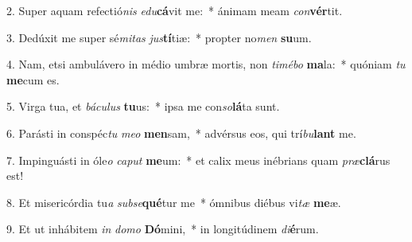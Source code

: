 2. Super aquam refectió\textit{nis} \textit{e}\textit{du}\textbf{cá}vit me:~*  ánimam meam \textit{con}\textbf{vér}tit.\

3. Dedúxit me super sé\textit{mi}\textit{tas} \textit{jus}\textbf{tí}tiæ:~*  propter no\textit{men} \textbf{su}um.\

4. Nam, etsi ambulávero in médio umbræ mortis, non \textit{ti}\textit{mé}\textit{bo} \textbf{ma}la:~*  quóniam \textit{tu} \textbf{me}cum es.\

5. Virga tua, et \textit{bá}\textit{cu}\textit{lus} \textbf{tu}us:~*  ipsa me con\textit{so}\textbf{lá}ta sunt.\

6. Parásti in conspéc\textit{tu} \textit{me}\textit{o} \textbf{men}sam,~*  advérsus eos, qui trí\textit{bu}\textbf{lant} me.\

7. Impinguásti in óle\textit{o} \textit{ca}\textit{put} \textbf{me}um:~*  et calix meus inébrians quam \textit{præ}\textbf{clá}rus est!\

8. Et misericórdia tu\textit{a} \textit{sub}\textit{se}\textbf{qué}tur me~*  ómnibus diébus vi\textit{tæ} \textbf{me}æ.\

9. Et ut inhábitem \textit{in} \textit{do}\textit{mo} \textbf{Dó}mini,~*  in longitúdinem \textit{di}\textbf{é}rum.\

